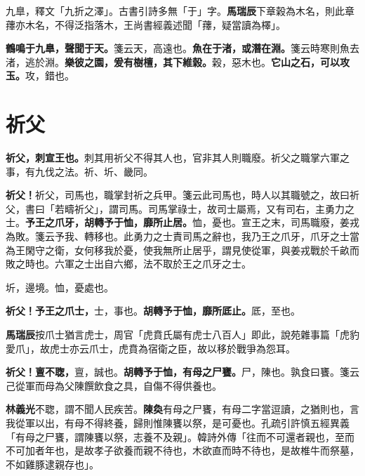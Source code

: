 \begin{quoting}九臯，釋文「九折之澤」。古書引詩多無「于」字。\textbf{馬瑞辰}下章榖為木名，則此章蘀亦木名，不得泛指落木，王尚書經義述聞「蘀，疑當讀為檡」。\end{quoting}

\textbf{鶴鳴于九臯，聲聞于天。}{\footnotesize 箋云天，高遠也。}\textbf{魚在于渚，或潛在淵。}{\footnotesize 箋云時寒則魚去渚，逃於淵。}\textbf{樂彼之園，爰有樹檀，其下維榖。}{\footnotesize 榖，惡木也。}\textbf{它山之石，可以攻玉。}{\footnotesize 攻，錯也。}

\section{祈父}


\textbf{祈父，刺宣王也。}{\footnotesize 刺其用祈父不得其人也，官非其人則職廢。祈父之職掌六軍之事，有九伐之法。祈、圻、畿同。}

\textbf{祈父！}{\footnotesize 祈父，司馬也，職掌封祈之兵甲。箋云此司馬也，時人以其職號之，故曰祈父，書曰「若疇祈父」，謂司馬。司馬掌祿士，故司士屬焉，又有司右，主勇力之士。}\textbf{予王之爪牙，胡轉予于恤，靡所止居。}{\footnotesize 恤，憂也。宣王之末，司馬職廢，姜戎為敗。箋云予我、轉移也。此勇力之士責司馬之辭也，我乃王之爪牙，爪牙之士當為王閑守之衛，女何移我於憂，使我無所止居乎，謂見使從軍，與姜戎戰於千畝而敗之時也。六軍之士出自六鄉，法不取於王之爪牙之士。}

\begin{quoting}圻，邊境。恤，憂處也。\end{quoting}

\textbf{祈父！予王之爪士，}{\footnotesize 士，事也。}\textbf{胡轉予于恤，靡所厎止。}{\footnotesize 厎，至也。}

\begin{quoting}\textbf{馬瑞辰}按爪士猶言虎士，周官「虎賁氏屬有虎士八百人」即此，說苑雜事篇「虎豹愛爪」，故虎士亦云爪士，虎賁為宿衛之臣，故以移於戰爭為怨耳。\end{quoting}

\textbf{祈父！亶不聦，}{\footnotesize 亶，誠也。}\textbf{胡轉予于恤，有母之尸饔。}{\footnotesize 尸，陳也。孰食曰饔。箋云己從軍而母為父陳饌飲食之具，自傷不得供養也。}

\begin{quoting}\textbf{林義光}不聦，謂不聞人民疾苦。\textbf{陳奐}有母之尸饔，有母二字當逗讀，之猶則也，言我從軍以出，有母不得終養，歸則惟陳饔以祭，是可憂也。孔疏引許慎五經異義「有母之尸饔，謂陳饔以祭，志養不及親」。韓詩外傳「往而不可還者親也，至而不可加者年也，是故孝子欲養而親不待也，木欲直而時不待也，是故椎牛而祭墓，不如雞豚逮親存也」。\end{quoting}

